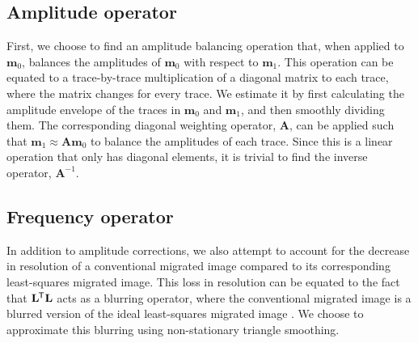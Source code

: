 \subsection{Amplitude operator}
First, we choose to find an amplitude balancing operation that, when applied to $\mathbf{m}_0$, balances the amplitudes of $\mathbf{m}_0$ with respect to $\mathbf{m}_1$. 
This operation can be equated to a trace-by-trace multiplication of a diagonal matrix to each trace, where the matrix changes for every trace.
We estimate it by first calculating the amplitude envelope of the traces in $\mathbf{m}_0$ and $\mathbf{m}_1$, and then smoothly dividing them.
The corresponding diagonal weighting operator, $\mathbf{A}$, can be applied such that $\mathbf{m}_1 \approx \mathbf{A}\mathbf{m}_0$ to balance the amplitudes of each trace.
Since this is a linear operation that only has diagonal elements, it is trivial to find the inverse operator, $\mathbf{A}^{-1}$. 


\subsection{Frequency operator}
In addition to amplitude corrections, we also attempt to account for the decrease in resolution of a conventional migrated image compared to its corresponding least-squares migrated image. 
This loss in resolution can be equated to the fact that $\mathbf{L}^{\mkern-1.5mu\mathsf{T}}\mathbf{L}$ acts as a blurring operator, where the conventional migrated image is a blurred version of the ideal least-squares migrated image \cite[]{poststack}. %
We choose to approximate this blurring using non-stationary triangle smoothing.


